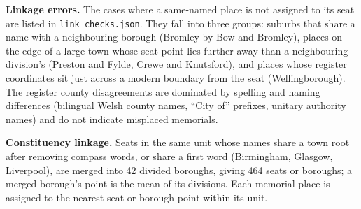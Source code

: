 \documentclass[11pt,a4paper]{article}
\begin{document}
\textbf{Linkage errors.} The cases where a same-named place is not assigned to its seat are listed in \texttt{link\_checks.json}. They fall into three groups: suburbs that share a name with a neighbouring borough (Bromley-by-Bow and Bromley), places on the edge of a large town whose seat point lies further away than a neighbouring division's (Preston and Fylde, Crewe and Knutsford), and places whose register coordinates sit just across a modern boundary from the seat (Wellingborough). The register county disagreements are dominated by spelling and naming differences (bilingual Welsh county names, ``City of'' prefixes, unitary authority names) and do not indicate misplaced memorials.

\textbf{Constituency linkage.} Seats in the same unit whose names share a town root after removing compass words, or share a first word (Birmingham, Glasgow, Liverpool), are merged into 42 divided boroughs, giving 464 seats or boroughs; a merged borough's point is the mean of its divisions. Each memorial place is assigned to the nearest seat or borough point within its unit.
\end{document}
